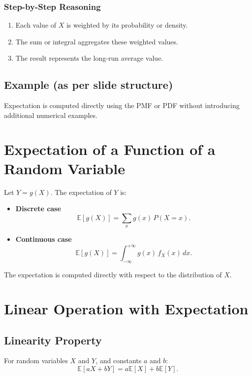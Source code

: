 \documentclass[12pt]{article}
\begin{document}
\subsubsection*{Step-by-Step Reasoning}

\begin{enumerate}
    \item Each value of $X$ is weighted by its probability or density.
    \item The sum or integral aggregates these weighted values.
    \item The result represents the long-run average value.
\end{enumerate}

\subsection{Example (as per slide structure)}

Expectation is computed directly using the PMF or PDF without introducing additional numerical examples.

\section{Expectation of a Function of a Random Variable}

Let $Y = g(X)$. The expectation of $Y$ is:

\begin{itemize}
    \item \textbf{Discrete case}
    \[
    \mathbb{E}[g(X)] = \sum_x g(x)\, P(X = x).
    \]

    \item \textbf{Continuous case}
    \[
    \mathbb{E}[g(X)] = \int_{-\infty}^{+\infty} g(x)\, f_X(x)\, dx.
    \]
\end{itemize}

The expectation is computed directly with respect to the distribution of $X$.

\section{Linear Operation with Expectation}

\subsection{Linearity Property}

For random variables $X$ and $Y$, and constants $a$ and $b$:
\[
\mathbb{E}[aX + bY] = a\mathbb{E}[X] + b\mathbb{E}[Y].
\]
\end{document}
